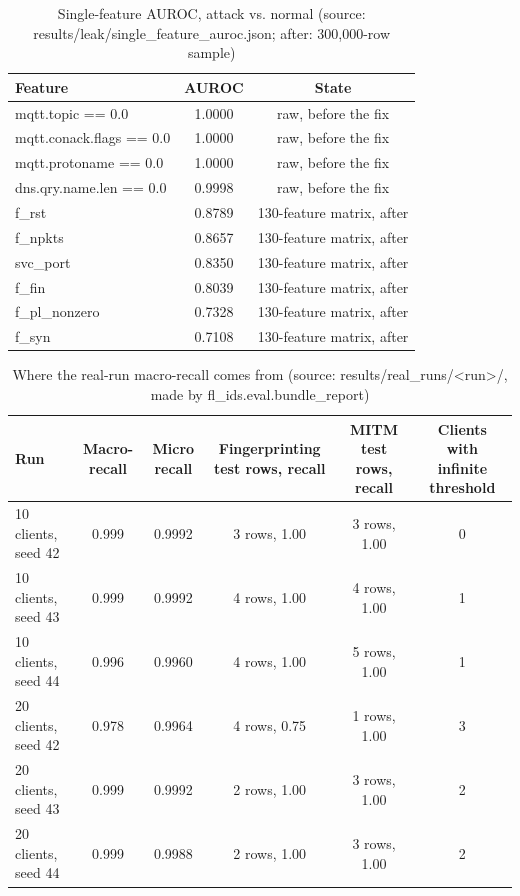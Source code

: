 \begin{table}[H]
\centering
\small
\setlength{\tabcolsep}{3pt}
\renewcommand{\arraystretch}{1.15}
\begin{tabular}{|l|c|c|}
\hline
\textbf{Feature} & \textbf{AUROC} & \textbf{State} \\ \hline
mqtt.topic == 0.0 & 1.0000 & raw, before the fix \\ \hline
mqtt.conack.flags == 0.0 & 1.0000 & raw, before the fix \\ \hline
mqtt.protoname == 0.0 & 1.0000 & raw, before the fix \\ \hline
dns.qry.name.len == 0.0 & 0.9998 & raw, before the fix \\ \hline
f\_rst & 0.8789 & 130-feature matrix, after \\ \hline
f\_npkts & 0.8657 & 130-feature matrix, after \\ \hline
svc\_port & 0.8350 & 130-feature matrix, after \\ \hline
f\_fin & 0.8039 & 130-feature matrix, after \\ \hline
f\_pl\_nonzero & 0.7328 & 130-feature matrix, after \\ \hline
f\_syn & 0.7108 & 130-feature matrix, after \\ \hline
\end{tabular}
\caption{Single-feature AUROC, attack vs. normal (source: results/leak/single\_feature\_auroc.json; after: 300,000-row sample)}
\label{tab:fu_leak}
\end{table}

\begin{table}[H]
\centering
\scriptsize
\setlength{\tabcolsep}{3pt}
\renewcommand{\arraystretch}{1.15}
\begin{tabular}{|l|c|c|c|c|c|}
\hline
\textbf{Run} & \textbf{Macro-recall} & \textbf{Micro recall} & \textbf{Fingerprinting test rows, recall} & \textbf{MITM test rows, recall} & \textbf{Clients with infinite threshold} \\ \hline
10 clients, seed 42 & 0.999 & 0.9992 & 3 rows, 1.00 & 3 rows, 1.00 & 0 \\ \hline
10 clients, seed 43 & 0.999 & 0.9992 & 4 rows, 1.00 & 4 rows, 1.00 & 1 \\ \hline
10 clients, seed 44 & 0.996 & 0.9960 & 4 rows, 1.00 & 5 rows, 1.00 & 1 \\ \hline
20 clients, seed 42 & 0.978 & 0.9964 & 4 rows, 0.75 & 1 rows, 1.00 & 3 \\ \hline
20 clients, seed 43 & 0.999 & 0.9992 & 2 rows, 1.00 & 3 rows, 1.00 & 2 \\ \hline
20 clients, seed 44 & 0.999 & 0.9988 & 2 rows, 1.00 & 3 rows, 1.00 & 2 \\ \hline
\end{tabular}
\caption{Where the real-run macro-recall comes from (source: results/real\_runs/<run>/, made by fl\_ids.eval.bundle\_report)}
\label{tab:fu_realrun_breakdown}
\end{table}

